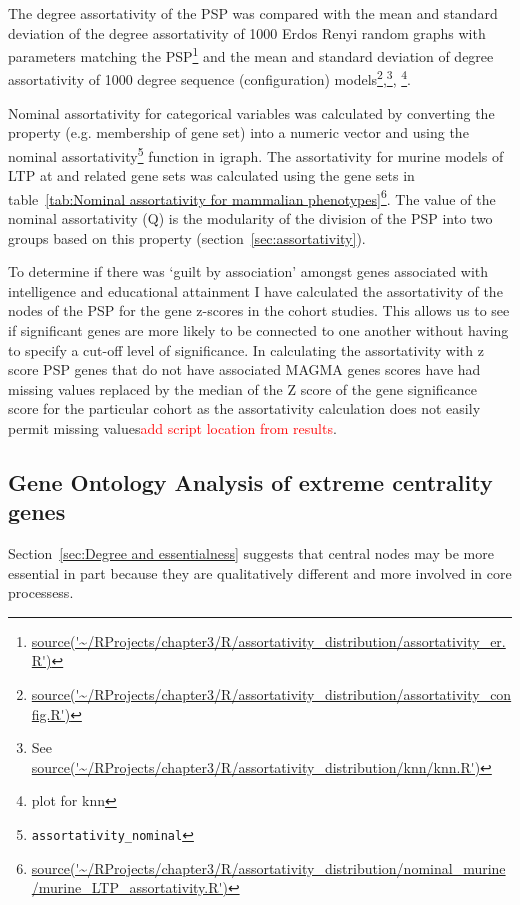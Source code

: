 The degree assortativity of the PSP was compared with the mean and standard deviation of the degree assortativity of 1000 Erdos Renyi random graphs with parameters matching the PSP\footnote{\url{source('~/RProjects/chapter3/R/assortativity_distribution/assortativity_er.R')}} and the mean and standard deviation of degree assortativity of 1000 degree sequence (configuration) models\footnote{\url{source('~/RProjects/chapter3/R/assortativity_distribution/assortativity_config.R')}},\footnote{See \url{source('~/RProjects/chapter3/R/assortativity_distribution/knn/knn.R')}}, \footnote{plot for knn}.

Nominal assortativity for categorical variables was calculated by converting the property (e.g. membership of gene set) into a numeric vector and using the nominal assortativity\footnote{\texttt{assortativity\_nominal}} function in igraph. The assortativity for murine models of LTP at and related gene sets was calculated using the gene sets in table~\ref{tab:Nominal assortativity for mammalian phenotypes}\footnote{\url{source('~/RProjects/chapter3/R/assortativity_distribution/nominal_murine/murine_LTP_assortativity.R')}}. The value of the nominal assortativity (Q) is the modularity of the division of the PSP into two groups based on this property (section~\ref{sec:assortativity}).

To determine if there was `guilt by association' amongst genes associated with intelligence and educational attainment I have calculated the assortativity of the nodes of the PSP for the gene z-scores in the cohort studies. This allows us to see if significant genes are more likely to be connected to one another without having to specify a cut-off level of significance. In calculating the assortativity with z score PSP genes that do not have associated MAGMA genes scores have had missing values  replaced by the median of the Z score of the gene significance score for the particular cohort as the assortativity calculation does not easily permit missing values\textcolor{red}{add script location from results}.


\subsection{Gene Ontology Analysis of extreme centrality genes}
\label{sec:Methods gene ontology centrality}

Section~\ref{sec:Degree and essentialness} suggests that central nodes may be more essential in part because they are qualitatively different and more involved in core processess. 

